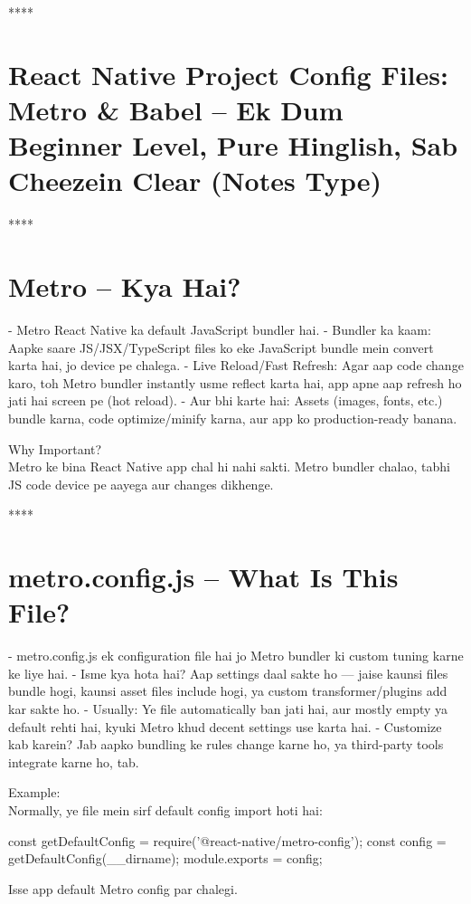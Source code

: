 \documentclass[a4paper]{article}
\newcommand\imp[1]{{\color{ImportantRed}#1}}
\begin{document}
****
\section*{React Native Project Config Files: Metro \& Babel – Ek Dum Beginner Level, Pure Hinglish, Sab Cheezein Clear (Notes Type)}
\rmfamily

****
\section*{Metro – Kya Hai?}
- \imp{Metro} React Native ka default \imp{JavaScript bundler} hai.
- \imp{Bundler ka kaam:} Aapke saare JS/JSX/TypeScript files ko \imp{eke JavaScript bundle} mein convert karta hai, jo device pe chalega.
- \imp{Live Reload/Fast Refresh:} Agar aap code change karo, toh Metro bundler instantly usme reflect karta hai, app apne aap refresh ho jati hai screen pe (hot reload).
- \imp{Aur bhi karte hai:} Assets (images, fonts, etc.) bundle karna, code optimize/minify karna, aur app ko production-ready banana.

\imp{Why Important?}\\
Metro ke bina React Native app chal hi nahi sakti. Metro bundler chalao, tabhi JS code device pe aayega aur changes dikhenge.

****
\section*{metro.config.js – What Is This File?}
- \imp{metro.config.js} ek configuration file hai jo Metro bundler ki \imp{custom tuning} karne ke liye hai.
- \imp{Isme kya hota hai?} Aap settings daal sakte ho — jaise kaunsi files bundle hogi, kaunsi asset files include hogi, ya custom transformer/plugins add kar sakte ho.
- \imp{Usually:} Ye file automatically ban jati hai, aur mostly empty ya default rehti hai, kyuki Metro khud decent settings use karta hai.
- \imp{Customize kab karein?} Jab aapko bundling ke rules change karne ho, ya third-party tools integrate karne ho, tab.

\imp{Example:}\\
Normally, ye file mein sirf default config import hoti hai:

\begin{codeblock}
const { getDefaultConfig } = require('@react-native/metro-config');
const config = getDefaultConfig(__dirname);
module.exports = config;
\end{codeblock}

Isse app default Metro config par chalegi.
\end{document}
